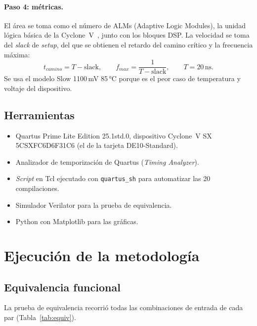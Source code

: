 \documentclass[11pt,letterpaper]{article}
\begin{document}
\paragraph{Paso 4: métricas.} El área se toma como el número de ALMs (Adaptive Logic Modules), la
unidad lógica básica de la Cyclone~V~\cite{alm}, junto con los bloques DSP. La velocidad se toma
del \emph{slack} de \emph{setup}, del que se obtienen el retardo del camino crítico y la
frecuencia máxima:
\begin{equation}
    t_{camino} = T - \text{slack}, \qquad f_{max} = \frac{1}{T - \text{slack}}, \qquad T = 20\,\text{ns}.
    \label{eq:fmax}
\end{equation}
Se usa el modelo Slow 1100\,mV 85\,°C porque es el peor caso de temperatura y voltaje del
dispositivo.

\subsection{Herramientas}
\begin{itemize}
    \item Quartus Prime Lite Edition 25.1std.0, dispositivo Cyclone~V SX 5CSXFC6D6F31C6 (el de la
    tarjeta DE10-Standard).
    \item Analizador de temporización de Quartus (\emph{Timing Analyzer}).
    \item \emph{Script} en Tcl ejecutado con \texttt{quartus\_sh} para automatizar las 20
    compilaciones.
    \item Simulador Verilator para la prueba de equivalencia.
    \item Python con Matplotlib para las gráficas.
\end{itemize}

\section{Ejecución de la metodología}

\subsection{Equivalencia funcional}

La prueba de equivalencia recorrió todas las combinaciones de entrada de cada par
(Tabla~\ref{tab:equiv}).
\end{document}
